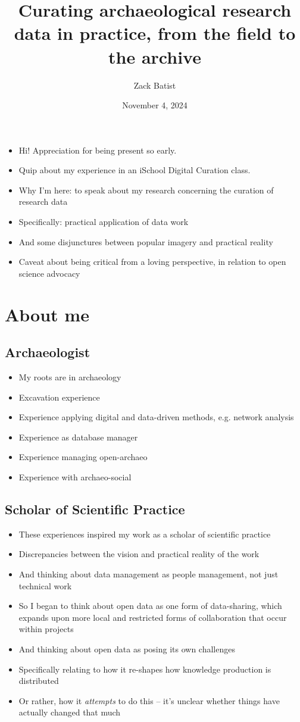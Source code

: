 \documentclass{article}
\title{Curating archaeological research data in practice, from the field to the archive}
\author{Zack Batist}
\date{November 4, 2024}
\begin{document}
\maketitle

\begin{itemize}
  \item Hi! Appreciation for being present so early.
  \item Quip about my experience in an iSchool Digital Curation class.
  \item Why I'm here: to speak about my research concerning the curation of research data
  \item Specifically: practical application of data work
  \item And some disjunctures between popular imagery and practical reality
  \item Caveat about being critical from a loving perspective, in relation to open science advocacy
\end{itemize}

\section{About me}
\subsection{Archaeologist}
\begin{itemize}
  \item My roots are in archaeology
  \item Excavation experience
  \item Experience applying digital and data-driven methods, e.g. network analysis
  \item Experience as database manager
  \item Experience managing open-archaeo
  \item Experience with archaeo-social
\end{itemize}

\subsection{Scholar of Scientific Practice}
\begin{itemize}
  \item These experiences inspired my work as a scholar of scientific practice
  \item Discrepancies between the vision and practical reality of the work
  \item And thinking about data management as people management, not just technical work
  \item So I began to think about open data as one form of data-sharing, which expands upon more local and restricted forms of collaboration that occur within projects
  \item And thinking about open data as posing its own challenges
  \item Specifically relating to how it re-shapes how knowledge production is distributed
  \item Or rather, how it \emph{attempts} to do this -- it's unclear whether things have actually changed that much
\end{itemize}
\end{document}
